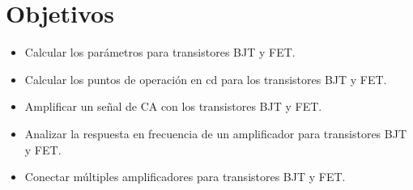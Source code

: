 \section{Objetivos}
\begin{itemize}
    \item Calcular los parámetros para transistores BJT y FET.
    \item Calcular los puntos de operación en cd para los transistores
          BJT y FET.
    \item Amplificar un señal de CA con los transistores BJT y FET. 
    \item Analizar la respuesta en frecuencia de un amplificador para
          transistores BJT y FET.
    \item Conectar múltiples amplificadores para transistores BJT y FET.
\end{itemize}

